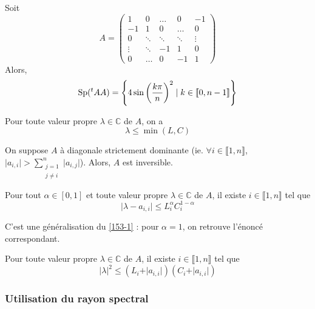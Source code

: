   \begin{example}
    Soit
    \[
      A =
      \begin{pmatrix}
        1 & 0 & \dots & 0 & -1 \\
        -1 & 1 & 0 & \dots & 0 \\
        0 & \ddots & \ddots & \ddots & \vdots \\
        \vdots & \ddots & -1 & 1 & 0 \\
        0 & \dots & 0 & -1 & 1
      \end{pmatrix}
    \]
    Alors,
    \[ \operatorname{Sp}(\mathstrut ^t AA) = \left\{ 4 \sin \left( \frac{k \pi}{n} \right)^2 \mid k \in \llbracket 0, n-1 \rrbracket \right\} \]
  \end{example}
  
  
  \begin{corollary}
    Pour toute valeur propre $\lambda \in \mathbb{C}$ de $A$, on a
    \[ \lambda \leq \min(L,C) \]
  \end{corollary}
  
  \begin{corollary}
    On suppose $A$ à diagonale strictement dominante (ie. $\forall i \in \llbracket 1, n \rrbracket$, $\vert a_{i,i} \vert > \sum_{\substack{j=1 \\ j \neq i}}^n \vert a_{i,j} \vert$). Alors, $A$ est inversible.
  \end{corollary}
  
  \begin{theorem}[Ostrowski]
    Pour tout $\alpha \in [0,1]$ et toute valeur propre $\lambda \in \mathbb{C}$ de $A$, il existe $i \in \llbracket 1, n \rrbracket$ tel que
    \[ \vert \lambda - a_{i,i} \vert \leq L_i^{\alpha} C_i^{1-\alpha} \]
  \end{theorem}
  
  \begin{remark}
    C'est une généralisation du \cref{153-1} : pour $\alpha = 1$, on retrouve l'énoncé correspondant.
  \end{remark}
  
  \begin{corollary}
    Pour toute valeur propre $\lambda \in \mathbb{C}$ de $A$, il existe $i \in \llbracket 1, n \rrbracket$ tel que
    \[ \vert \lambda \vert^2 \leq (L_i + \vert a_{i,i} \vert) (C_i + \vert a_{i,i} \vert) \]
  \end{corollary}
  
  \subsubsection{Utilisation du rayon spectral}
  
